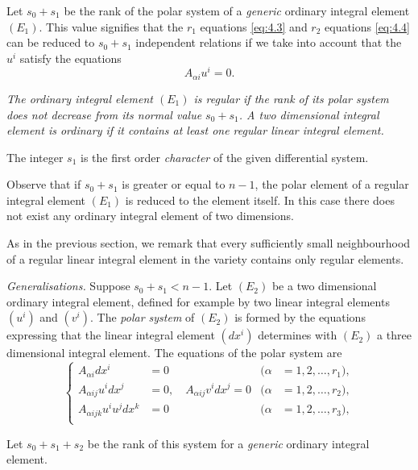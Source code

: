 \documentclass[leqno,11pt]{book}
\numberwithin{equation}{chapter}
\theoremstyle{shape1}
\theoremstyle{shape0}
\theoremstyle{shape2}
\theoremstyle{definition}
\begin{document}
Let $s_{0}+s_{1}$ be the rank of the polar system of a \emph{generic} ordinary integral element $(E_{1})$. This value signifies that the $r_{1}$ equations \eqref{eq:4.3}  and $r_{2}$ equations \eqref{eq:4.4} can be reduced to $s_{0}+s_{1}$ independent relations if we take into account that the $u^{i}$ satisfy the equations
\[
A_{\alpha i}u^{i}=0.
\]

\emph{The ordinary integral element $(E_{1})$ is regular if the rank of its polar system does not decrease from its normal value $s_{0}+s_{1}$. A two dimensional integral element  is  ordinary if it contains at least one regular linear integral element.}

The integer $s_{1}$ is  the first order \emph{character} of the given differential system.

Observe that if $s_{0}+s_{1}$ is greater or equal to $n-1$, the polar element of a regular integral element $(E_{1}) $ is reduced to the element itself. In this case there does not exist any ordinary integral element of two dimensions.

As in the previous section, we  remark that every sufficiently small neighbourhood of a regular linear integral element  in the variety contains only regular elements.

\vspace{12pt}\fsec \emph{Generalisations.} Suppose $s_{0}+s_{1}<n-1$. Let $(E_{2})$ be a two dimensional ordinary integral element, defined for example by two linear integral elements $(u^{i})$ and $(v^{i})$. The \emph{polar system} of $(E_{2})$ is formed by the equations expressing that the linear integral element $(dx^{i})$ determines with $(E_{2})$ a three dimensional integral element. The equations of the polar system are
\begin{equation}
  \label{eq:4.5}
  \left\{
    \begin{aligned}
      A_{\alpha i}dx^{i}&=0&(\alpha&=1,2,\dots,r_{1}),\\
      A_{\alpha ij}u^{i}dx^{j}&=0,\quad A_{\alpha ij}v^{i}dx^{j}=0&(\alpha&=1,2,\dots,r_{2}),\\
      A_{\alpha ijk}u^{i}u^{j}dx^{k}&=0&(\alpha&=1,2,\dots,r_{3}),\\
    \end{aligned}
  \right.
\end{equation}

Let $s_{0}+s_{1}+s_{2}$ be the rank of this system for a \emph{generic} ordinary integral element.
\end{document}
